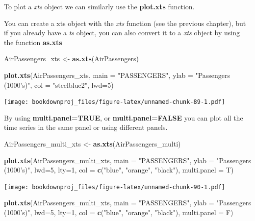 \documentclass[
]{article}
\newenvironment{Shaded}{\begin{snugshade}}{\end{snugshade}}
\newcommand{\DataTypeTok}[1]{\textcolor[rgb]{0.13,0.29,0.53}{#1}}
\newcommand{\DecValTok}[1]{\textcolor[rgb]{0.00,0.00,0.81}{#1}}
\newcommand{\KeywordTok}[1]{\textcolor[rgb]{0.13,0.29,0.53}{\textbf{#1}}}
\newcommand{\NormalTok}[1]{#1}
\newcommand{\StringTok}[1]{\textcolor[rgb]{0.31,0.60,0.02}{#1}}
\begin{document}
To plot a \emph{xts} object we can similarly use the \textbf{plot.xts} function.

You can create a xts object with the \emph{xts} function (see the previous chapter), but if you already have a \emph{ts} object, you can also convert it to a \emph{xts} object by using the function \textbf{as.xts}

\begin{Shaded}
\begin{Highlighting}[]
\NormalTok{AirPassengers_xts <-}\StringTok{ }\KeywordTok{as.xts}\NormalTok{(AirPassengers)}

\KeywordTok{plot.xts}\NormalTok{(AirPassengers_xts,}
         \DataTypeTok{main =} \StringTok{"PASSENGERS"}\NormalTok{,}
         \DataTypeTok{ylab =} \StringTok{"Passengers (1000's)"}\NormalTok{, }
         \DataTypeTok{col =} \StringTok{"steelblue2"}\NormalTok{, }
         \DataTypeTok{lwd=}\DecValTok{5}\NormalTok{)}
\end{Highlighting}
\end{Shaded}

\texttt{[image: bookdownproj\_files/figure-latex/unnamed-chunk-89-1.pdf]}

By using \textbf{multi.panel=TRUE}, or \textbf{multi.panel=FALSE} you can plot all the time series in the same panel or using different panels.

\begin{Shaded}
\begin{Highlighting}[]
\NormalTok{AirPassengers_multi_xts <-}\StringTok{ }\KeywordTok{as.xts}\NormalTok{(AirPassengers_multi)}

\KeywordTok{plot.xts}\NormalTok{(AirPassengers_multi_xts,}
         \DataTypeTok{main =} \StringTok{"PASSENGERS"}\NormalTok{,}
         \DataTypeTok{ylab =} \StringTok{"Passengers (1000's)"}\NormalTok{, }
         \DataTypeTok{lwd=}\DecValTok{5}\NormalTok{, }\DataTypeTok{lty=}\DecValTok{1}\NormalTok{,}
         \DataTypeTok{col =} \KeywordTok{c}\NormalTok{(}\StringTok{"blue"}\NormalTok{, }\StringTok{"orange"}\NormalTok{, }\StringTok{"black"}\NormalTok{),}
         \DataTypeTok{multi.panel =}\NormalTok{ T)}
\end{Highlighting}
\end{Shaded}

\texttt{[image: bookdownproj\_files/figure-latex/unnamed-chunk-90-1.pdf]}

\begin{Shaded}
\begin{Highlighting}[]
\KeywordTok{plot.xts}\NormalTok{(AirPassengers_multi_xts,}
         \DataTypeTok{main =} \StringTok{"PASSENGERS"}\NormalTok{,}
         \DataTypeTok{ylab =} \StringTok{"Passengers (1000's)"}\NormalTok{, }
         \DataTypeTok{lwd=}\DecValTok{5}\NormalTok{, }\DataTypeTok{lty=}\DecValTok{1}\NormalTok{,}
         \DataTypeTok{col =} \KeywordTok{c}\NormalTok{(}\StringTok{"blue"}\NormalTok{, }\StringTok{"orange"}\NormalTok{, }\StringTok{"black"}\NormalTok{),}
         \DataTypeTok{multi.panel =}\NormalTok{ F)}
\end{Highlighting}
\end{Shaded}
\end{document}
